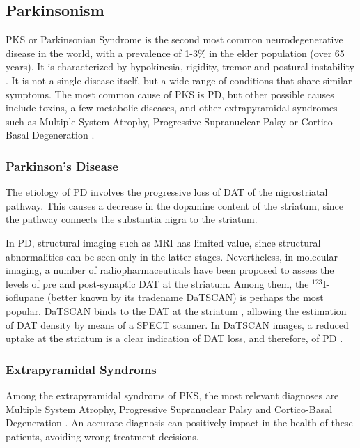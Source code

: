 \subsection{Parkinsonism}
\acf{PKS} or Parkinsonian Syndrome is the second most common neurodegenerative disease in the world, with a prevalence of 1-3\% in the elder population (over 65 years)\cite{Eckert2007}. It is characterized by hypokinesia, rigidity, tremor and postural instability \cite{Eckert2007}. It is not a single disease itself, but a wide range of conditions that share similar symptoms. The most common cause of \ac{PKS} is \acf{PD}, but other possible causes include toxins, a few metabolic diseases, and other extrapyramidal syndromes such as Multiple System Atrophy, Progressive Supranuclear Palsy or Cortico-Basal Degeneration \cite{Christine2004,tatsch2008extrapyramidal}. 

\subsubsection{Parkinson's Disease}
The etiology of \acf{PD} involves the progressive loss of \acf{DAT} of the nigrostriatal pathway. This causes a decrease in the dopamine content of the striatum, since the pathway connects the substantia nigra to the striatum. 

In \ac{PD}, structural imaging such as \ac{MRI} has limited value, since structural abnormalities can be seen only in the latter stages. Nevertheless, in molecular imaging, a number of radiopharmaceuticals have been proposed to assess the levels of pre and post-synaptic \ac{DAT} at the striatum. Among them, the $^{123}$I-ioflupane (better known by its tradename DaTSCAN) is perhaps the most popular. DaTSCAN binds to the \ac{DAT} at the striatum \cite{Winogrodzka2003,PunalRioboo2007,Eckert2007}, allowing the estimation of \ac{DAT} density by means of a \ac{SPECT} scanner. In DaTSCAN images, a reduced uptake at the striatum is a clear indication of \ac{DAT} loss, and therefore, of \ac{PD} \cite{PunalRioboo2007}.
  
\subsubsection{Extrapyramidal Syndroms}
Among the extrapyramidal syndroms of \ac{PKS}, the most relevant diagnoses are Multiple System Atrophy, Progressive Supranuclear Palsy and Cortico-Basal Degeneration \cite{tatsch2008extrapyramidal}. An accurate diagnosis can positively impact in the health of these patients, avoiding wrong treatment decisions. 


